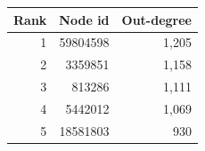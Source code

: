\begin{tabular}{rrr}
\toprule
Rank & Node id & Out-degree \\
\midrule
1 & 59804598 & 1,205 \\
2 & 3359851 & 1,158 \\
3 & 813286 & 1,111 \\
4 & 5442012 & 1,069 \\
5 & 18581803 & 930 \\
\bottomrule
\end{tabular}
